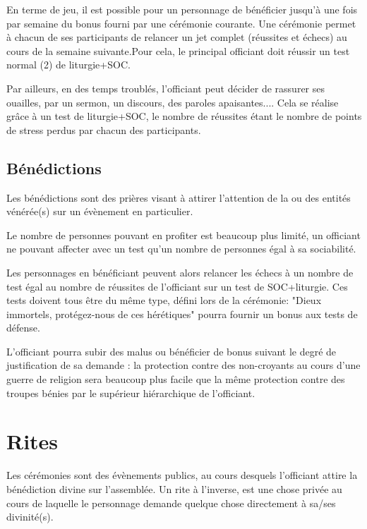 \documentclass[10pt,a4paper,twocolumn]{book}
\begin{document}
En terme de jeu, il est possible pour un personnage de bénéficier jusqu'à une fois par semaine du bonus fourni par une cérémonie courante. Une cérémonie permet à chacun de ses participants de relancer un jet complet (réussites et échecs) au cours de la semaine suivante.Pour cela, le principal officiant doit réussir un test normal (2) de liturgie+SOC.

Par ailleurs, en des temps troublés, l'officiant peut décider de rassurer ses ouailles, par un sermon, un discours, des paroles apaisantes.... Cela se réalise grâce à un test de liturgie+SOC, le nombre de réussites étant le nombre de points de stress perdus par chacun des participants.
\subsection*{Bénédictions}
Les bénédictions sont des prières visant à attirer l'attention de la ou des entités vénérée(s) sur un évènement en particulier.

Le nombre de personnes pouvant en profiter est beaucoup plus limité, un officiant ne pouvant affecter avec un test qu'un nombre de personnes égal à sa sociabilité. 

Les personnages en bénéficiant peuvent alors relancer les échecs à un nombre de test égal au nombre de réussites de l'officiant sur un test de SOC+liturgie. Ces tests doivent tous être du même type, défini lors de la cérémonie: "Dieux immortels, protégez-nous de ces hérétiques" pourra fournir un bonus aux tests de défense.

L'officiant pourra subir des malus ou bénéficier de bonus suivant le degré de justification de sa demande : la protection contre des non-croyants au cours d'une guerre de religion sera beaucoup plus facile que la même protection contre des troupes bénies par le supérieur hiérarchique de l'officiant.

\section{Rites}
Les cérémonies sont des évènements publics, au cours desquels l'officiant attire la bénédiction divine sur l'assemblée. Un rite à l'inverse, est une chose privée au cours de laquelle le personnage demande quelque chose directement à sa/ses divinité(s).
\end{document}
